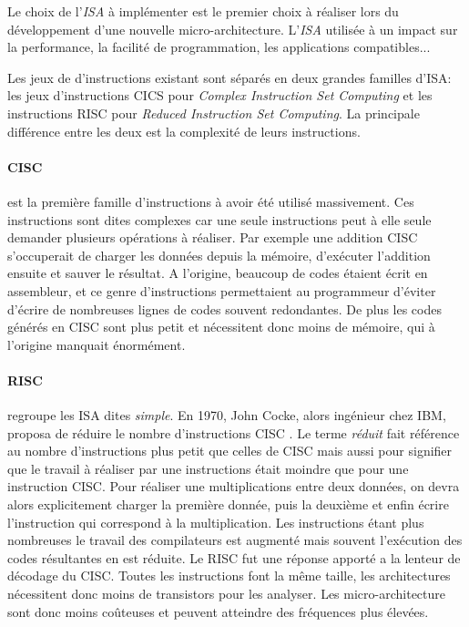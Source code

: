 Le choix de l'\textit{ISA} à implémenter est le premier choix à réaliser lors du développement d'une nouvelle micro-architecture. L'\textit{ISA} utilisée à un impact sur la performance, la facilité de programmation, les applications compatibles...

Les jeux de d'instructions existant sont séparés en deux grandes familles d'ISA: les jeux d'instructions CICS pour \textit{Complex Instruction Set Computing} et les instructions RISC pour \textit{Reduced Instruction Set Computing}. La principale différence entre les deux est la complexité de leurs instructions. 

    \paragraph{CISC} est la première famille d'instructions à avoir été utilisé massivement. Ces instructions sont dites complexes car une seule instructions peut à elle seule demander plusieurs opérations à réaliser. Par exemple une addition CISC s'occuperait de charger les données depuis la mémoire, d'exécuter l'addition ensuite et sauver le résultat. A l'origine, beaucoup de codes étaient écrit en assembleur, et ce genre d'instructions permettaient au programmeur d'éviter d'écrire de nombreuses lignes de codes souvent redondantes. De plus les codes générés en CISC sont plus petit et nécessitent donc moins de mémoire, qui à l'origine manquait énormément.

    \paragraph{RISC} regroupe les ISA dites \textit{simple}. En 1970, John Cocke, alors ingénieur chez IBM, proposa de réduire le nombre d'instructions CISC \cite{cocke1990evolution}. Le terme \textit{réduit} fait référence au nombre d'instructions plus petit que celles de CISC mais aussi pour signifier que le travail à réaliser par une instructions était moindre que pour une instruction CISC. Pour réaliser une multiplications entre deux données, on devra alors explicitement charger la première donnée, puis la deuxième et enfin écrire l'instruction qui correspond à la multiplication. Les instructions étant plus nombreuses le travail des compilateurs est augmenté mais souvent l'exécution des codes résultantes en est réduite. Le RISC fut une réponse apporté a la lenteur de décodage du CISC.  Toutes les instructions font la même taille, les architectures nécessitent donc moins de transistors pour les analyser. Les micro-architecture sont donc moins coûteuses et peuvent atteindre des fréquences plus élevées.

